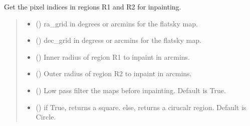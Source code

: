 \documentclass[letterpaper,10pt,english]{sphinxmanual}
\begin{document}
\begin{fulllineitems}
\label{\detokenize{inpaint:inpaint.get_mask_indices}}
\pysigstartsignatures
{}
\pysigstopsignatures
\sphinxAtStartPar
Get the pixel indices in regions R1 and R2 for inpainting.
\begin{quote}\begin{description}
\begin{itemize}
\item {} 
\sphinxAtStartPar
{} () \textendash{} ra\_grid in degrees or arcmins for the flatsky map.

\item {} 
\sphinxAtStartPar
{} () \textendash{} dec\_grid in degress or arcmins for the flatsky map.

\item {} 
\sphinxAtStartPar
{} () \textendash{} Inner radius of region R1 to inpaint in arcmins.

\item {} 
\sphinxAtStartPar
{} () \textendash{} Outer radius of region R2 to inpaint in arcmins.

\item {} 
\sphinxAtStartPar
{} () \textendash{} Low pass filter the maps before inpainting.
Default is True.

\item {} 
\sphinxAtStartPar
{} () \textendash{} if True, returns a square.
else, returns a cirucalr region.
Default is Circle.


\end{itemize}
\end{description}
\end{quote}
\end{fulllineitems}
\end{document}
